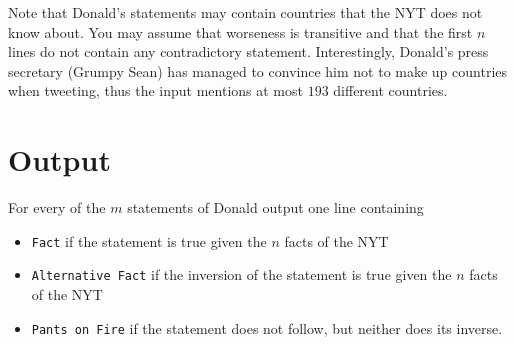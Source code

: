 Note that Donald's statements may contain countries that the NYT does not know about.
You may assume that worseness is transitive and that the first $n$ lines do not contain any contradictory statement.
Interestingly, Donald's press secretary (Grumpy Sean) has managed to convince him not to make up countries when tweeting, thus the input mentions at most $193$ different countries.

%
\pagebreak
\section*{Output}
For every of the $m$ statements of Donald output one line containing
\begin{itemize}
	\item \texttt{Fact} if the statement is true given the $n$ facts of the NYT
	\item \texttt{Alternative Fact} if the inversion of the statement is true given the $n$ facts of the NYT
	\item \texttt{Pants on Fire} if the statement does not follow, but neither does its inverse.
\end{itemize}
